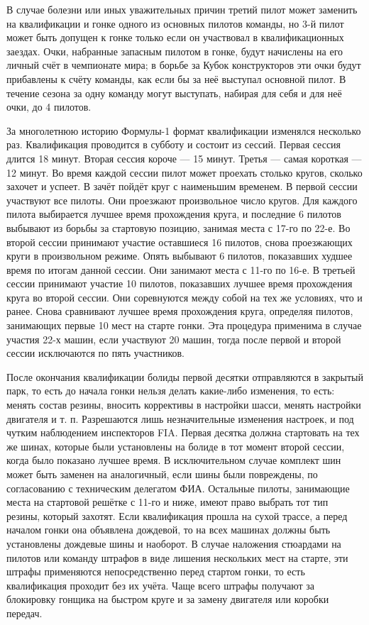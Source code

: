 \documentclass[14pt,a4paper]{extreport}
\begin{document}
	\flushleft\hspace{4ex} В случае болезни или иных уважительных причин третий пилот может заменить на квалификации и гонке одного из основных пилотов команды, но 3-й пилот может быть допущен к гонке только если он участвовал в квалификационных заездах. Очки, набранные запасным пилотом в гонке, будут начислены на его личный счёт в чемпионате мира; в борьбе за Кубок конструкторов эти очки будут прибавлены к счёту команды, как если бы за неё выступал основной пилот. В течение сезона за одну команду могут выступать, набирая для себя и для неё очки, до 4 пилотов.\par
	\hspace{4ex}За многолетнюю историю Формулы-1 формат квалификации изменялся несколько раз. Квалификация проводится в субботу и состоит из сессий. Первая сессия длится 18 минут. Вторая сессия короче — 15 минут. Третья — самая короткая — 12 минут. Во время каждой сессии пилот может проехать столько кругов, сколько захочет и успеет. В зачёт пойдёт круг с наименьшим временем. В первой сессии участвуют все пилоты. Они проезжают произвольное число кругов. Для каждого пилота выбирается лучшее время прохождения круга, и последние 6 пилотов выбывают из борьбы за стартовую позицию, занимая места с 17-го по 22-е. Во второй сессии принимают участие оставшиеся 16 пилотов, снова проезжающих круги в произвольном режиме. Опять выбывают 6 пилотов, показавших худшее время по итогам данной сессии. Они занимают места с 11-го по 16-е. В третьей сессии принимают участие 10 пилотов, показавших лучшее время прохождения круга во второй сессии. Они соревнуются между собой на тех же условиях, что и ранее. Снова сравнивают лучшее время прохождения круга, определяя пилотов, занимающих первые 10 мест на старте гонки. Эта процедура применима в случае участия 22-х машин, если участвуют 20 машин, тогда после первой и второй сессии исключаются по пять участников.\par
	\hspace{4ex}После окончания квалификации болиды первой десятки отправляются в закрытый парк, то есть до начала гонки нельзя делать какие-либо изменения, то есть: менять состав резины, вносить коррективы в настройки шасси, менять настройки двигателя и т. п. Разрешаются лишь незначительные изменения настроек, и под чутким наблюдением инспекторов FIA. Первая десятка должна стартовать на тех же шинах, которые были установлены на болиде в тот момент второй сессии, когда было показано лучшее время. В исключительном случае комплект шин может быть заменен на аналогичный, если шины были повреждены, по согласованию с техническим делегатом ФИА. Остальные пилоты, занимающие места на стартовой решётке с 11-го и ниже, имеют право выбрать тот тип резины, который захотят. Если квалификация прошла на сухой трассе, а перед началом гонки она объявлена дождевой, то на всех машинах должны быть установлены дождевые шины и наоборот. В случае наложения стюардами на пилотов или команду штрафов в виде лишения нескольких мест на старте, эти штрафы применяются непосредственно перед стартом гонки, то есть квалификация проходит без их учёта. Чаще всего штрафы получают за блокировку гонщика на быстром круге и за замену двигателя или коробки передач.\par
\end{document}
